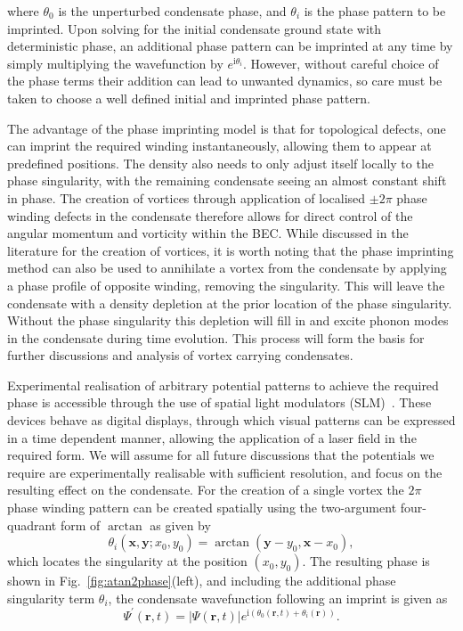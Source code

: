 where $\theta_0$ is the unperturbed condensate phase, and $\theta_i$ is the phase pattern to be imprinted. Upon solving for the initial condensate ground state with deterministic phase, an additional phase pattern can be imprinted at any time by simply multiplying the wavefunction by $e^{\text{i}\theta_i}$. However, without careful choice of the phase terms their addition can lead to unwanted dynamics, so care must be taken to choose a well defined initial and imprinted phase pattern.

The advantage of the phase imprinting model is that for topological defects, one can imprint the required winding instantaneously, allowing them to appear at predefined positions. The density also needs to only adjust itself locally to the phase singularity, with the remaining condensate seeing an almost constant shift in phase. The creation of vortices through application of localised $\pm 2\pi$ phase winding defects in the condensate therefore allows for direct control of the angular momentum and vorticity within the BEC. While discussed in the literature for the creation of vortices, it is worth noting that the phase imprinting method can also be used to annihilate a vortex from the condensate by applying a phase profile of opposite winding, removing the singularity. This will leave the condensate with a density depletion at the prior location of the phase singularity. Without the phase singularity this depletion will fill in and excite phonon modes in the condensate during time evolution. This process will form the basis for further discussions and analysis of vortex carrying condensates.

Experimental realisation of arbitrary potential patterns to achieve the required phase is accessible through the use of spatial light modulators (SLM)~\cite{VTX:Moulder_pra_2012}. These devices behave as digital displays, through which visual patterns can be expressed in a time dependent manner, allowing the application of a laser field in the required form. We will assume for all future discussions that the potentials we require are experimentally realisable with sufficient resolution, and focus on the resulting effect on the condensate. For the creation of a single vortex the $2\pi$ phase winding pattern can be created spatially using the two-argument four-quadrant form of $\arctan$ as given by
\begin{equation}
    \theta_i(\mathbf{x},\mathbf{y};x_0,y_0) = \arctan(\mathbf{y}-y_0,\mathbf{x}-x_0),
\end{equation}
which locates the singularity at the position $\left(x_0,y_0\right)$. The resulting phase is shown in Fig.~\ref{fig:atan2phase}(left), and including the additional phase singularity term $\theta_i$, the condensate wavefunction following an imprint is given as
\begin{equation}
    \Psi^{'}(\mathbf{r},t) = |\Psi(\mathbf{r},t)|e^{\text{i}(\theta_0(\mathbf{r},t) + \theta_i(\mathbf{r}))}.
\end{equation}

